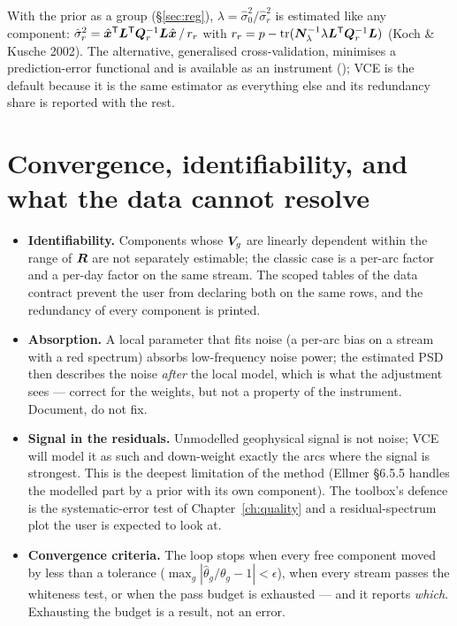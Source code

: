 With the prior as a group (\S\ref{sec:reg}), $\lambda = \hat\sigma_0^2/\hat\sigma_r^2$ is estimated like any component: $\hat\sigma_r^2 = \hat{\bm{x}}^{\mathsf T}\bm{L}^{\mathsf T}\bm{Q}_r^{-1}\bm{L}\hat{\bm{x}}\,/\,r_r$ with $r_r = p - \operatorname{tr}(\bm{N}_\lambda^{-1}\lambda\bm{L}^{\mathsf T}\bm{Q}_r^{-1}\bm{L})$ (Koch \& Kusche 2002). The alternative, generalised cross-validation, minimises a prediction-error functional and is available as an instrument (); VCE is the default because it is the same estimator as everything else and its redundancy share is reported with the rest.

\section{Convergence, identifiability, and what the data cannot resolve}
\label{sec:vcelimits}

\begin{itemize}
\item \textbf{Identifiability.} Components whose $\bm{V}_g$ are linearly dependent within the range of $\bm{R}$ are not separately estimable; the classic case is a per-arc factor and a per-day factor on the same stream. The scoped tables of the data contract prevent the user from declaring both on the same rows, and the redundancy of every component is printed.
\item \textbf{Absorption.} A local parameter that fits noise (a per-arc bias on a stream with a red spectrum) absorbs low-frequency noise power; the estimated PSD then describes the noise \emph{after} the local model, which is what the adjustment sees --- correct for the weights, but not a property of the instrument. Document, do not fix.
\item \textbf{Signal in the residuals.} Unmodelled geophysical signal is not noise; VCE will model it as such and down-weight exactly the arcs where the signal is strongest. This is the deepest limitation of the method (Ellmer §6.5.5 handles the modelled part by a prior with its own component). The toolbox's defence is the systematic-error test of Chapter~\ref{ch:quality} and a residual-spectrum plot the user is expected to look at.
\item \textbf{Convergence criteria.} The loop stops when every free component moved by less than a tolerance ($\max_g|\hat\theta_g/\theta_g - 1| < \epsilon$), when every stream passes the whiteness test, or when the pass budget is exhausted --- and it reports \emph{which}. Exhausting the budget is a result, not an error.
\end{itemize}
